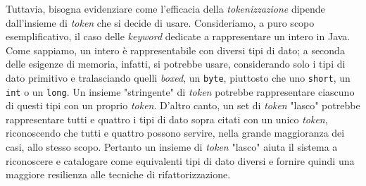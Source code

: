 Tuttavia, bisogna evidenziare come l'efficacia della \textit{tokenizzazione} dipende dall'insieme di \textit{token} che si decide di usare.
%
Consideriamo, a puro scopo esemplificativo, il caso delle \textit{keyword} dedicate a rappresentare un intero in Java.
%
Come sappiamo, un intero è rappresentabile con diversi tipi di dato; a seconda delle esigenze di memoria, infatti, si potrebbe usare, considerando solo i tipi di dato primitivo e tralasciando quelli \textit{boxed}, un \texttt{byte}, piuttosto che uno \texttt{short}, un \texttt{int} o un \texttt{long}. 
%
Un insieme "stringente" di \textit{token} potrebbe rappresentare ciascuno di questi tipi con un proprio \textit{token}.
%
D'altro canto, un set di \textit{token} "lasco" potrebbe rappresentare tutti e quattro i tipi di dato sopra citati con un unico \textit{token}, riconoscendo che tutti e quattro possono servire, nella grande maggioranza dei casi, allo stesso scopo.
%
Pertanto un insieme di \textit{token} "lasco" aiuta il sistema a riconoscere e catalogare come equivalenti tipi di dato diversi e fornire quindi una maggiore resilienza alle tecniche di rifattorizzazione.

